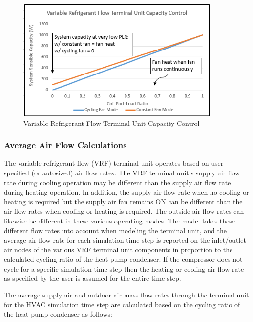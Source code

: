 \begin{figure}[hbtp]
\centering
\includegraphics[width=0.9\textwidth, height=0.9\textheight, keepaspectratio=true]{media/VRFTUCapacityControl.png}
\caption{Variable Refrigerant Flow Terminal Unit Capacity Control \label{fig:variable-refrigerant-flow-terminal-unit-capacity-control}}
\end{figure}

\subsubsection{Average Air Flow Calculations}\label{average-air-flow-calculations-2}

The variable refrigerant flow (VRF) terminal unit operates based on user-specified (or autosized) air flow rates. The VRF terminal unit's supply air flow rate during cooling operation may be different than the supply air flow rate during heating operation. In addition, the supply air flow rate when no cooling or heating is required but the supply air fan remains ON can be different than the air flow rates when cooling or heating is required. The outside air flow rates can likewise be different in these various operating modes. The model takes these different flow rates into account when modeling the terminal unit, and the average air flow rate for each simulation time step is reported on the inlet/outlet air nodes of the various VRF terminal unit components in proportion to the calculated cycling ratio of the heat pump condenser. If the compressor does not cycle for a specific simulation time step then the heating or cooling air flow rate as specified by the user is assumed for the entire time step.

The average supply air and outdoor air mass flow rates through the terminal unit for the HVAC simulation time step are calculated based on the cycling ratio of the heat pump condenser as follows:

